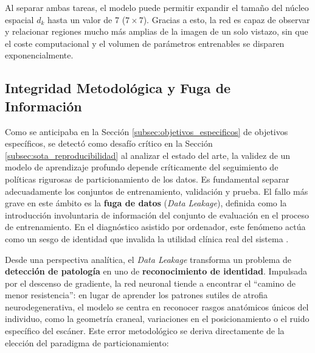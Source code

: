 \documentclass[12pt, oneside, english, spanish]{book}
\begin{document}
Al separar ambas tareas, el modelo puede permitir expandir el tamaño del núcleo espacial $d_k$ hasta un valor de 7 ($7 \times 7$). Gracias a esto, la red es capaz de observar y relacionar regiones mucho más amplias de la imagen de un solo vistazo, sin que el coste computacional y el volumen de parámetros entrenables se disparen exponencialmente.


\subsection{Integridad Metodológica y Fuga de Información} \label{subsec:integridad_leakage}

Como se anticipaba en la Sección \ref{subsec:objetivos_especificos} de objetivos específicos, se detectó como desafío crítico en la Sección \ref{subsec:sota_reproducibilidad} al analizar el estado del arte, la validez de un modelo de aprendizaje profundo depende críticamente del seguimiento de políticas rigurosas de particionamiento de los datos. Es fundamental separar adecuadamente los conjuntos de entrenamiento, validación y prueba. El fallo más grave en este ámbito es la \textbf{fuga de datos} (\textit{Data Leakage}), definida como la introducción involuntaria de información del conjunto de evaluación en el proceso de entrenamiento. En el diagnóstico asistido por ordenador, este fenómeno actúa como un sesgo de identidad que invalida la utilidad clínica real del sistema \cite{wen2020convolutional}.

Desde una perspectiva analítica, el \textit{Data Leakage} transforma un problema de \textbf{detección de patología} en uno de \textbf{reconocimiento de identidad}. Impulsada por el descenso de gradiente, la red neuronal tiende a encontrar el ``camino de menor resistencia'': en lugar de aprender los patrones sutiles de atrofia neurodegenerativa, el modelo se centra en reconocer rasgos anatómicos únicos del individuo, como la geometría craneal, variaciones en el posicionamiento o el ruido específico del escáner. Este error metodológico se deriva directamente de la elección del paradigma de particionamiento:
\end{document}
